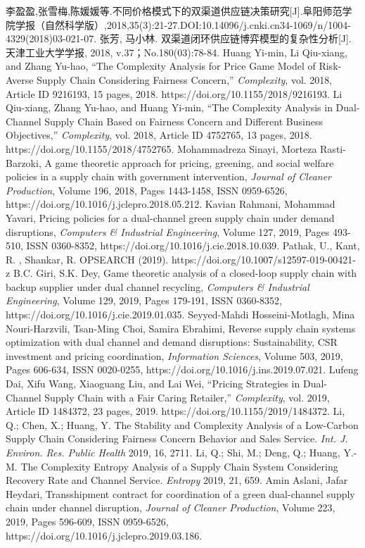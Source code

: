\documentclass{article}
\begin{document}
\begin{thebibliography}{1}
 李盈盈,张雪梅,陈媛媛等.不同价格模式下的双渠道供应链决策研究[J].阜阳师范学院学报（自然科学版）,2018,35(3):21-27.DOI:10.14096/j.cnki.cn34-1069/n/1004-4329(2018)03-021-07.
 张芳, 马小林. 双渠道闭环供应链博弈模型的复杂性分析[J]. 天津工业大学学报, 2018, v.37；No.180(03):78-84.
 Huang Yi-min, Li Qiu-xiang, and Zhang Yu-hao, “The Complexity Analysis for Price Game Model of Risk-Averse Supply Chain Considering Fairness Concern,” \emph{Complexity}, vol. 2018, Article ID 9216193, 15 pages, 2018. https://doi.org/10.1155/2018/9216193.
 Li Qiu-xiang, Zhang Yu-hao, and Huang Yi-min, “The Complexity Analysis in Dual-Channel Supply Chain Based on Fairness Concern and Different Business Objectives,” \emph{Complexity}, vol. 2018, Article ID 4752765, 13 pages, 2018. https://doi.org/10.1155/2018/4752765.
 Mohammadreza Sinayi, Morteza Rasti-Barzoki, A game theoretic approach for pricing, greening, and social welfare policies in a supply chain with government intervention, \emph{Journal of Cleaner Production}, Volume 196, 2018, Pages 1443-1458, ISSN 0959-6526, https://doi.org/10.1016/j.jclepro.2018.05.212.
 Kavian Rahmani, Mohammad Yavari, Pricing policies for a dual-channel green supply chain under demand disruptions, \emph{Computers \& Industrial Engineering}, Volume 127, 2019, Pages 493-510, ISSN 0360-8352, https://doi.org/10.1016/j.cie.2018.10.039.
 Pathak, U., Kant, R. , Shankar, R. OPSEARCH (2019). https://doi.org/10.1007/s12597-019-00421-z
 B.C. Giri, S.K. Dey, Game theoretic analysis of a closed-loop supply chain with backup supplier under dual channel recycling, \emph{Computers \& Industrial Engineering}, Volume 129, 2019, Pages 179-191, ISSN 0360-8352, https://doi.org/10.1016/j.cie.2019.01.035. 
 Seyyed-Mahdi Hosseini-Motlagh, Mina Nouri-Harzvili, Tsan-Ming Choi, Samira Ebrahimi, Reverse supply chain systems optimization with dual channel and demand disruptions: Sustainability, CSR investment and pricing coordination, \emph{Information Sciences}, Volume 503, 2019, Pages 606-634, ISSN 0020-0255, https://doi.org/10.1016/j.ins.2019.07.021.
 Lufeng Dai, Xifu Wang, Xiaoguang Liu, and Lai Wei, “Pricing Strategies in Dual-Channel Supply Chain with a Fair Caring Retailer,” \emph{Complexity}, vol. 2019, Article ID 1484372, 23 pages, 2019. https://doi.org/10.1155/2019/1484372.
 Li, Q.; Chen, X.; Huang, Y. The Stability and Complexity Analysis of a Low-Carbon Supply Chain Considering Fairness Concern Behavior and Sales Service. \emph{Int. J. Environ. Res. Public Health} 2019, 16, 2711.
 Li, Q.; Shi, M.; Deng, Q.; Huang, Y.-M. The Complexity Entropy Analysis of a Supply Chain System Considering Recovery Rate and Channel Service. \emph{Entropy} 2019, 21, 659.
 Amin Aslani, Jafar Heydari, Transshipment contract for coordination of a green dual-channel supply chain under channel disruption, \emph{Journal of Cleaner Production}, Volume 223, 2019, Pages 596-609, ISSN 0959-6526, https://doi.org/10.1016/j.jclepro.2019.03.186.

\end{thebibliography}
\end{document}
